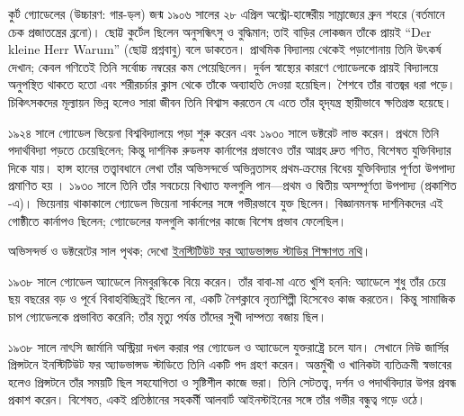 \documentclass[../../../include/open-logic-section]{subfiles}
\begin{document}



কুর্ট গ্যোডেলের (উচ্চারণ: \textsc{গার}-ড্‌ল) জন্ম
১৯০৬ সালের ২৮ এপ্রিল অস্ট্রো-হাঙ্গেরীয় সাম্রাজ্যের
ব্রুন শহরে (বর্তমানে চেক প্রজাতন্ত্রের ব্রনো)। ছোট্ট
কুর্টেল ছিলেন অনুসন্ধিৎসু ও বুদ্ধিমান; তাই বাড়ির
লোকজন তাঁকে প্রায়ই “Der kleine Herr Warum”
(ছোট্ট প্রশ্নবাবু) বলে ডাকতেন। প্রাথমিক বিদ্যালয়
থেকেই পড়াশোনায় তিনি উৎকর্ষ দেখান; কেবল গণিতেই
তিনি সর্বোচ্চ নম্বরের কম পেয়েছিলেন। দুর্বল স্বাস্থ্যের
কারণে গ্যোডেলকে প্রায়ই বিদ্যালয়ে অনুপস্থিত থাকতে
হতো এবং শরীরচর্চার ক্লাস থেকে তাঁকে অব্যাহতি
দেওয়া হয়েছিল। শৈশবে তাঁর বাতজ্বর ধরা পড়ে।
চিকিৎসকদের মূল্যায়ন ভিন্ন হলেও সারা জীবন তিনি
বিশ্বাস করতেন যে এতে তাঁর হৃদ্‌যন্ত্র স্থায়ীভাবে
ক্ষতিগ্রস্ত হয়েছে।

১৯২৪ সালে গ্যোডেল ভিয়েনা বিশ্ববিদ্যালয়ে পড়া শুরু
করেন এবং ১৯৩০ সালে ডক্টরেট লাভ করেন।
প্রথমে তিনি পদার্থবিদ্যা পড়তে চেয়েছিলেন; কিন্তু
দার্শনিক রুডলফ কার্নাপের প্রভাবেও তাঁর আগ্রহ দ্রুত
গণিত, বিশেষত যুক্তিবিদ্যার দিকে যায়। হান্স হানের
তত্ত্বাবধানে লেখা তাঁর অভিসন্দর্ভে অভিন্নতাসহ
প্রথম-ক্রমের বিধেয় যুক্তিবিদ্যার পূর্ণতা উপপাদ্য
প্রমাণিত হয় \citep{Godel1929}। ১৯৩০ সালে তিনি
তাঁর সবচেয়ে বিখ্যাত ফলগুলি পান—প্রথম ও দ্বিতীয়
অসম্পূর্ণতা উপপাদ্য (প্রকাশিত \citealt{Godel1931}-এ)। ভিয়েনায় থাকাকালে
গ্যোডেল ভিয়েনা সার্কলের সঙ্গে গভীরভাবে যুক্ত ছিলেন।
বিজ্ঞানমনস্ক দার্শনিকদের এই গোষ্ঠীতে কার্নাপও
ছিলেন; গ্যোডেলের ফলগুলি কার্নাপের কাজে বিশেষ
প্রভাব ফেলেছিল।

\par\smallskip\noindent অভিসন্দর্ভ ও ডক্টরেটের সাল পৃথক; দেখো \href{https://www.ias.edu/scholars/godel}{ইনস্টিটিউট ফর অ্যাডভান্সড স্টাডির শিক্ষাগত নথি}।

১৯৩৮ সালে গ্যোডেল অ্যাডেলে নিমবুরস্কিকে বিয়ে
করেন। তাঁর বাবা-মা এতে খুশি হননি: অ্যাডেলে শুধু
তাঁর চেয়ে ছয় বছরের বড় ও পূর্বে বিবাহবিচ্ছিন্নই
ছিলেন না, একটি নৈশক্লাবে নৃত্যশিল্পী হিসেবেও কাজ
করতেন। কিন্তু সামাজিক চাপ গ্যোডেলকে প্রভাবিত
করেনি; তাঁর মৃত্যু পর্যন্ত তাঁদের সুখী দাম্পত্য বজায়
ছিল।

১৯৩৮ সালে নাৎসি জার্মানি অস্ট্রিয়া দখল করার পর
গ্যোডেল ও অ্যাডেলে যুক্তরাষ্ট্রে চলে যান। সেখানে
নিউ জার্সির প্রিন্সটনে ইনস্টিটিউট ফর অ্যাডভান্সড
স্টাডিতে তিনি একটি পদ গ্রহণ করেন। অন্তর্মুখী
ও খানিকটা ব্যতিক্রমী স্বভাবের হলেও প্রিন্সটনে তাঁর
সময়টি ছিল সহযোগিতা ও সৃষ্টিশীল কাজে ভরা।
তিনি সেটতত্ত্ব, দর্শন ও পদার্থবিদ্যার উপর প্রবন্ধ
প্রকাশ করেন। বিশেষত, একই প্রতিষ্ঠানের সহকর্মী
আলবার্ট আইনস্টাইনের সঙ্গে তাঁর গভীর বন্ধুত্ব গড়ে
ওঠে।
\end{document}
